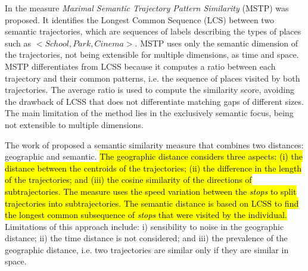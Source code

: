 

In \cite{Ying:2010:MUS:1867699.1867703} the measure \emph{Maximal Semantic Trajectory Pattern Similarity} (MSTP) was proposed. It identifies the Longest Common Sequence (LCS) between two semantic trajectories, which are sequences of labels describing the types of places such as $<School, Park, Cinema>$. {MSTP uses only the semantic dimension of the trajectories, not being extensible for multiple dimensions, as time and space.} MSTP differentiates from LCSS because it computes a ratio between each trajectory and their common patterns, i.e. the sequence of places visited by both trajectories. The average ratio is used to compute the similarity score, avoiding the drawback of LCSS that does not differentiate matching gaps of different sizes. {The main limitation of the method lies in the exclusively semantic focus, being not extensible to multiple dimensions.}

The work of \cite{Liu:2012:SMM:2442968.2442971} proposed a semantic similarity measure that combines two distances: geographic and semantic. \hl{The geographic distance considers three aspects: (i) the distance between the centroids of the trajectories; (ii) the difference in the length of the trajectories; and (iii) the cosine similarity of the directions of subtrajectories. The measure uses the speed variation between the \emph{stops} to split trajectories into subtrajectories. The semantic distance is based on LCSS to find the longest common subsequence of \emph{stops} that were visited by the individual.} Limitations of this approach include: i) sensibility to noise in the geographic distance; ii) the time distance is not considered; and iii) the prevalence of the geographic distance, i.e. two trajectories are similar only if they are similar in space.

